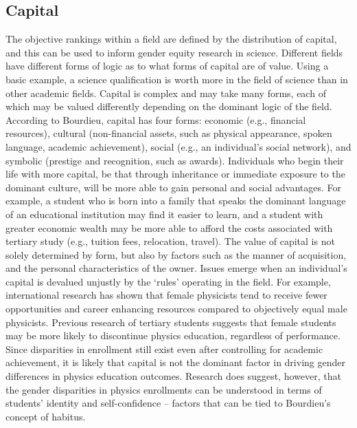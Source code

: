 \subsection{Capital}
The objective rankings within a field are defined by the distribution of capital, and this can be used to inform gender equity research in science.\cite{Kelly_1985} Different fields have different forms of logic as to what forms of capital are of value. Using a basic example, a science qualification is worth more in the field of science than in other academic fields. Capital is complex and may take many forms, each of which may be valued differently depending on the dominant logic of the field. According to Bourdieu\cite{Bourdieu_1986}, capital has four forms: economic (e.g., financial resources), cultural (non-financial assets, such as physical appearance, spoken language, academic achievement), social (e.g., an individual's social network), and symbolic (prestige and recognition, such as awards). Individuals who begin their life with more capital, be that through inheritance or immediate exposure to the dominant culture, will be more able to gain personal and social advantages. For example, a student who is born into a family that speaks the dominant language of an educational institution may find it easier to learn, and a student with greater economic wealth may be more able to afford the costs associated with tertiary study (e.g., tuition fees, relocation, travel). The value of capital is not solely determined by form, but also by factors such as the manner of acquisition, and the personal characteristics of the owner. Issues emerge when an individual's capital is devalued unjustly by the `rules' operating in the field. For example, international research has shown that female physicists tend to receive fewer opportunities and career enhancing resources compared to objectively equal male physicists.\cite{Ivie_2013} Previous research of tertiary students suggests that female students may be more likely to discontinue physics education, regardless of performance.\cite{Ellis_2016,Ost_2010} Since disparities in enrollment still exist even after controlling for academic achievement, it is likely that capital is not the dominant factor in driving gender differences in physics education outcomes. Research does suggest, however, that the gender disparities in physics enrollments can be understood in terms of students' identity\cite{Brown2010,Hazari_2010,Hazari2013,Brewe_2016,Hazari2017} and self-confidence\cite{Litzler2014,Concannon2009,Sharma_2011,Beth_Kurtz_Costes_2008,Sawtelle_2012} -- factors that can be tied to Bourdieu's concept of habitus.

